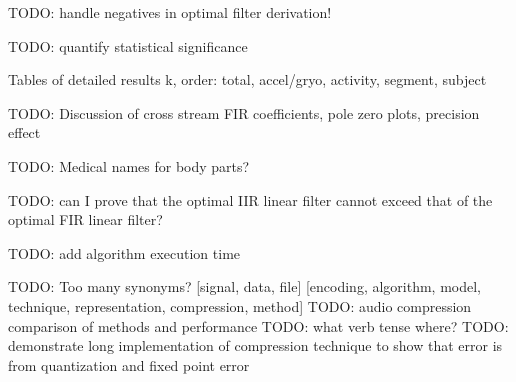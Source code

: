 \documentclass[journal]{IEEEtran}
\begin{document}
TODO: handle negatives in optimal filter derivation!

TODO: quantify statistical significance

Tables of detailed results k, order: total, accel/gryo, activity, segment, subject 

TODO: Discussion of cross stream FIR coefficients, pole zero plots, precision effect

TODO: Medical names for body parts?

TODO: can I prove that the optimal IIR linear filter cannot exceed that of the optimal FIR linear filter?

TODO: add algorithm execution time

TODO: Too many synonyms? [signal, data, file] [encoding, algorithm, model, technique, representation, compression, method]
TODO: audio compression comparison of methods and performance
TODO: what verb tense where?
TODO: demonstrate long implementation of compression technique to show that error is from quantization and fixed point error
\end{document}

